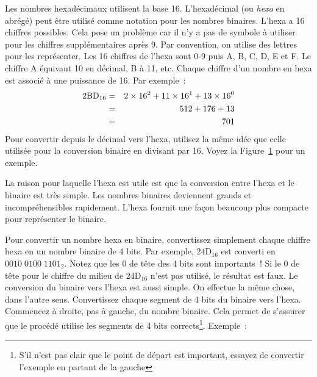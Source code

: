 Les nombres hexadécimaux utilisent la base 16. L'hexadécimal
(ou \emph{hexa} en abrégé) peut être utilisé comme notation pour les
nombres binaires. L'hexa a 16 chiffres possibles. Cela pose un problème car
il n'y a pas de symbole à utiliser pour les chiffres supplémentaires après 9.
Par convention, on utilise des lettres pour les représenter.
Les 16 chiffres de l'hexa sont 0-9 puis A, B, C, D, E et F. Le chiffre A équivaut
10 en décimal, B à 11, etc. Chaque chiffre d'un nombre en hexa est associé à une
puissance de 16. Par exemple~:\begin{eqnarray*}
\rm
2BD_{16} & = & 2 \times 16^2 + 11 \times 16^1 + 13 \times 16^0 \\
         & = & 512 + 176 + 13 \\
         & = & 701 \\
\end{eqnarray*}
Pour convertir depuis le décimal vers l'hexa, utilisez la même idée que celle
utilisée pour la conversion binaire en divisant par 16. Voyez la Figure~\ref{fig:hex-conv}
pour un exemple.

\begin{figure}[t]
\centering
{}
\caption{\label{fig:hex-conv}}
\end{figure}

La raison pour laquelle l'hexa est utile est que la conversion entre l'hexa
et le binaire est très simple. Les nombres binaires deviennent grands et
incompréhensibles rapidement. L'hexa fournit une façon beaucoup plus compacte
pour représenter le binaire.

Pour convertir un nombre hexa en binaire, convertissez simplement chaque chiffre
hexa en un nombre binaire de 4 bits. Par exemple, $\mathrm{24D}_{16}$ est converti
en \mbox{$0010\;0100\; 1101_2$}. Notez que les 0 de tête des 4 bits sont importants~!
Si le 0 de tête pour le chiffre du milieu de $\mathrm{24D}_{16}$ n'est pas utilisé,
le résultat est faux. Le conversion du binaire vers l'hexa est aussi simple. On effectue
la même chose, dans l'autre sens. Convertissez chaque segment de 4 bits du binaire vers
l'hexa. Commencez à droite, pas à gauche, du nombre binaire. Cela permet de
s'assurer que le procédé utilise les segments de 4 bits corrects\footnote{S'il n'est
pas clair que le point de départ est important, essayez de convertir l'exemple en
partant de la gauche}. Exemple~:\newline

